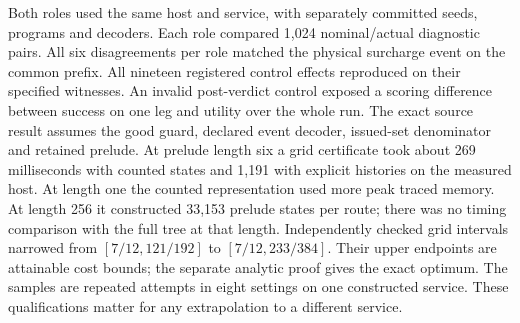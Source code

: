 Both roles used the same host and service, with separately committed seeds, programs and decoders. Each role compared 1,024 nominal/actual diagnostic pairs. All six disagreements per role matched the physical surcharge event on the common prefix. All nineteen registered control effects reproduced on their specified witnesses. An invalid post-verdict control exposed a scoring difference between success on one leg and utility over the whole run. The exact source result assumes the good guard, declared event decoder, issued-set denominator and retained prelude. At prelude length six a grid certificate took about 269 milliseconds with counted states and 1,191 with explicit histories on the measured host. At length one the counted representation used more peak traced memory. At length 256 it constructed 33,153 prelude states per route; there was no timing comparison with the full tree at that length. Independently checked grid intervals narrowed from \([7/12,121/192]\) to \([7/12,233/384]\). Their upper endpoints are attainable cost bounds; the separate analytic proof gives the exact optimum. The samples are repeated attempts in eight settings on one constructed service. These qualifications matter for any extrapolation to a different service.
